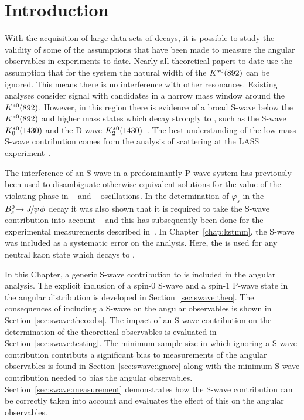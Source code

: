 \section{Introduction}
\label{sec:swave:intro}

With the acquisition of large data sets of \BdToKstll decays,
it is possible to study the validity of some of the assumptions that have been 
made to measure the angular observables in experiments to date. 
Nearly all theoretical papers to date use the 
assumption that for the \kpi system the natural width of
the $K^{*0}(892)$ can be ignored. 
This means there is no interference with other
\kpi resonances. Existing \BdToKstll analyses
consider \BdToKstll signal with \kpi candidates in a
narrow mass window around the $K^{*0}(892)$. 
However, in this region
there is evidence of a broad S-wave below the $K^{*0}(892)$
and higher mass states which decay strongly to \kpi, such as the S-wave $K^{*0}_{0}(1430)$
and the D-wave $K^{*0}_{2}(1430)$~\cite{PDG2012}. 
The best understanding of the low mass S-wave contribution comes from
the analysis of \kpi scattering at the LASS experiment~\cite{Aston:179353}. 

The interference of an S-wave in a predominantly P-wave system has
previously been used to disambiguate otherwise equivalent solutions
for the value of the \CP-violating phase in \Bz~\cite{Aubert:2004cp}
and \Bs~\cite{Aaij:2012eq} oscillations.
In the determination of $\varphi_s$ in the $\decay{\Bs}{\jpsi\phi}$ decay it was also shown
 that it is required to take the S-wave contribution into account 
~\cite{Xie:2009fs} and this has subsequently been done for the experimental 
measurements described in~\cite{CDF:2011af,Abazov:2011ry,LHCb-PAPER-2011-021}.
In Chapter~\ref{chap:kstmm}, the S-wave was included as a systematic error on the analysis.
Here, the \Kstarz is used for any neutral kaon state which decays to \kpi. 

In this Chapter, a generic \kpi S-wave contribution to \BdToKstll is included in the angular analysis.  
The explicit inclusion of a spin-0 S-wave and a spin-1 P-wave state in the 
\BdToKpill angular distribution is developed in Section~\ref{sec:swave:theo}.
The consequences of including a \kpi S-wave on the angular observables is shown in Section~\ref{sec:swave:theo:obs}.
The impact of an S-wave contribution on the determination of the theoretical observables is evaluated in Section~\ref{sec:swave:testing}.
The minimum sample size in which ignoring a \kpi S-wave contribution contributs a significant bias to measurements of 
the angular observables is found in Section~\ref{sec:swave:ignore}
along with the minimum S-wave contribution needed to bias the angular observables.
Section~\ref{sec:swave:measurement} demonstrates how the S-wave contribution can be correctly taken into account and 
evaluates the effect of this on the angular observables.
